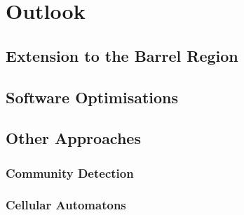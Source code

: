 



\section{Outlook}
\subsection{Extension to the Barrel Region}
\subsection{Software Optimisations}

\subsection{Other Approaches}
\subsubsection{Community Detection}
\subsubsection{Cellular Automatons}

